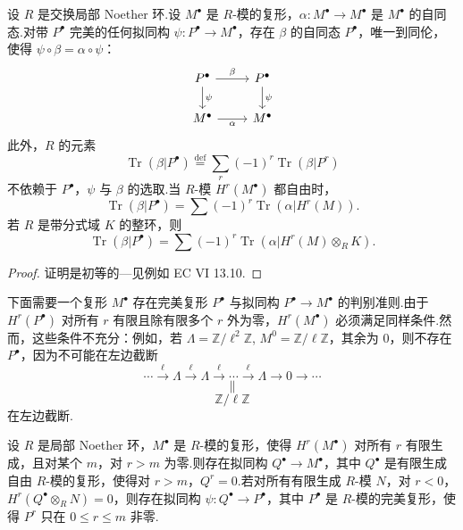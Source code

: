 \begin{proposition}\label{prop:29.17}
设 $R$ 是交换局部 Noether 环.设 $M^{\bullet}$ 是 $R$-模的复形，$\alpha \colon M^{\bullet} \to M^{\bullet}$ 是 $M^{\bullet}$ 的自同态.对带 $P^{\bullet}$ 完美的任何拟同构 $\psi \colon P^{\bullet} \to M^{\bullet}$，存在 $\beta$ 的自同态 $P^{\bullet}$，唯一到同伦，使得 $\psi \circ \beta = \alpha \circ \psi$：
\[
\begin{tikzcd}
P^{\bullet} \arrow[r, "\beta"] \arrow[d, "\psi"] & P^{\bullet} \arrow[d, "\psi"] \\
M^{\bullet} \arrow[r, "\alpha"'] & M^{\bullet}
\end{tikzcd}
\]
此外，$R$ 的元素
\[
\operatorname{Tr}(\beta|P^{\bullet}) \overset{\mathrm{def}}{=} \sum_{r} (-1)^{r} \operatorname{Tr}(\beta|P^{r})
\]
不依赖于 $P^{\bullet}$，$\psi$ 与 $\beta$ 的选取.当 $R$-模 $H^{r}(M^{\bullet})$ 都自由时，
\[
\operatorname{Tr}(\beta|P^{\bullet}) = \sum (-1)^{r} \operatorname{Tr}(\alpha|H^{r}(M)).
\]
若 $R$ 是带分式域 $K$ 的整环，则
\[
\operatorname{Tr}(\beta|P^{\bullet}) = \sum (-1)^{r} \operatorname{Tr}(\alpha|H^{r}(M) \otimes_{R} K).
\]
\end{proposition}

\begin{proof}
证明是初等的---见例如 EC VI 13.10.
\end{proof}

下面需要一个复形 $M^{\bullet}$ 存在完美复形 $P^{\bullet}$ 与拟同构 $P^{\bullet} \to M^{\bullet}$ 的判别准则.由于 $H^{r}(P^{\bullet})$ 对所有 $r$ 有限且除有限多个 $r$ 外为零，$H^{r}(M^{\bullet})$ 必须满足同样条件.然而，这些条件不充分：例如，若 $\Lambda = \mathbb{Z}/\ell^{2}\mathbb{Z}$, $M^{0} = \mathbb{Z}/\ell\mathbb{Z}$，其余为 0，则不存在 $P^{\bullet}$，因为不可能在左边截断
\[
\cdots \xrightarrow{\ell} \Lambda \xrightarrow{\ell} \Lambda \xrightarrow{\ell} \cdots \xrightarrow{\ell} \Lambda \to 0 \to \cdots
\]
\[
\parallel
\]
\[
\mathbb{Z}/\ell\mathbb{Z}
\]
在左边截断.

\begin{proposition}\label{prop:29.18}
设 $R$ 是局部 Noether 环，$M^{\bullet}$ 是 $R$-模的复形，使得 $H^{r}(M^{\bullet})$ 对所有 $r$ 有限生成，且对某个 $m$，对 $r > m$ 为零.则存在拟同构 $Q^{\bullet} \to M^{\bullet}$，其中 $Q^{\bullet}$ 是有限生成自由 $R$-模的复形，使得对 $r > m$，$Q^{r} = 0$.若对所有有限生成 $R$-模 $N$，对 $r < 0$，$H^{r}(Q^{\bullet} \otimes_{R} N) = 0$，则存在拟同构 $\psi \colon Q^{\bullet} \to P^{\bullet}$，其中 $P^{\bullet}$ 是 $R$-模的完美复形，使得 $P^{r}$ 只在 $0 \leq r \leq m$ 非零.
\end{proposition}

